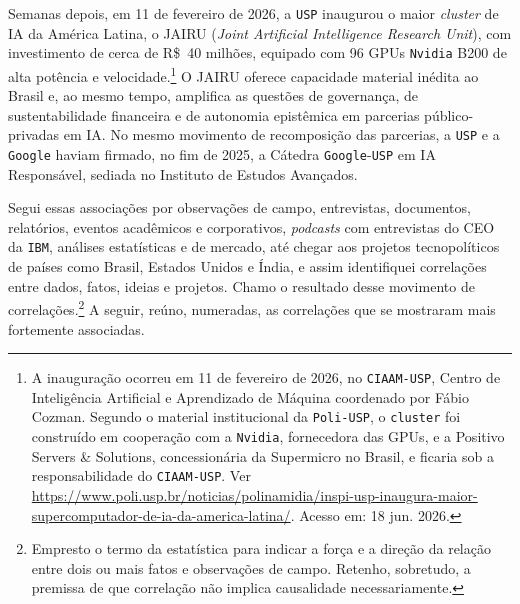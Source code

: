 Semanas depois, em 11 de fevereiro de 2026, a \texttt{USP} inaugurou o maior \emph{cluster} de IA da América Latina, o JAIRU (\textit{Joint Artificial Intelligence Research Unit}), com investimento de cerca de R\$~40 milhões, equipado com 96 GPUs \texttt{Nvidia} B200 de alta potência e velocidade.\footnote{A inauguração ocorreu em 11 de fevereiro de 2026, no \texttt{CIAAM-USP}, Centro de Inteligência Artificial e Aprendizado de Máquina coordenado por Fábio Cozman. Segundo o material institucional da \texttt{Poli-USP}, o \texttt{cluster} foi construído em cooperação com a \texttt{Nvidia}, fornecedora das GPUs, e a Positivo Servers \& Solutions, concessionária da Supermicro no Brasil, e ficaria sob a responsabilidade do \texttt{CIAAM-USP}. Ver \url{https://www.poli.usp.br/noticias/polinamidia/inspi-usp-inaugura-maior-supercomputador-de-ia-da-america-latina/}. Acesso em: 18 jun. 2026.} O JAIRU oferece capacidade material inédita ao Brasil e, ao mesmo tempo, amplifica as questões de governança, de sustentabilidade financeira e de autonomia epistêmica em parcerias público-privadas em IA. No mesmo movimento de recomposição das parcerias, a \texttt{USP} e a \texttt{Google} haviam firmado, no fim de 2025, a Cátedra \texttt{Google}-\texttt{USP} em IA Responsável, sediada no Instituto de Estudos Avançados. %

Segui essas associações por observações de campo, entrevistas, documentos, relatórios, eventos acadêmicos e corporativos, \emph{podcasts} com entrevistas do CEO da \texttt{IBM}, análises estatísticas e de mercado, até chegar aos projetos tecnopolíticos de países como Brasil, Estados Unidos e Índia, e assim identifiquei correlações entre dados, fatos, ideias e projetos. Chamo o resultado desse movimento de correlações.\footnote{Empresto o termo da estatística para indicar a força e a direção da relação entre dois ou mais fatos e observações de campo. Retenho, sobretudo, a premissa de que correlação não implica causalidade necessariamente.} A seguir, reúno, numeradas, as correlações que se mostraram mais fortemente associadas.

